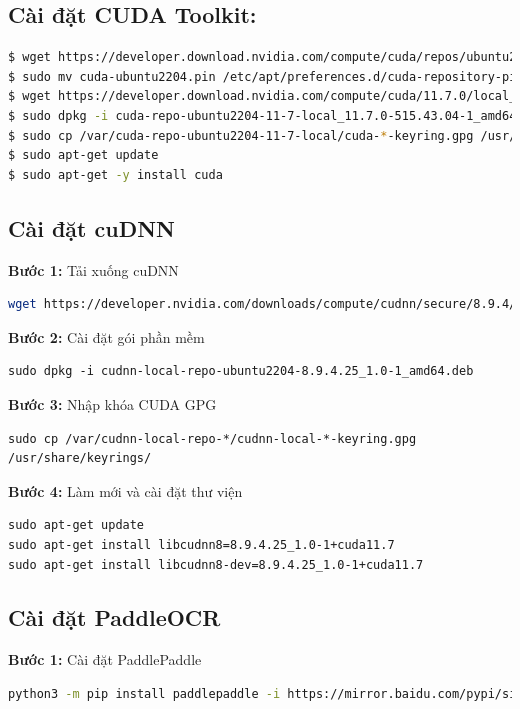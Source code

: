 \subsection{Cài đặt CUDA Toolkit:}
\begin{lstlisting}[language=bash]
$ wget https://developer.download.nvidia.com/compute/cuda/repos/ubuntu2204/x86_64/cuda-ubuntu2204.pin
$ sudo mv cuda-ubuntu2204.pin /etc/apt/preferences.d/cuda-repository-pin-600
$ wget https://developer.download.nvidia.com/compute/cuda/11.7.0/local_installers/cuda-repo-ubuntu2204-11-7-local_11.7.0-515.43.04-1_amd64.deb
$ sudo dpkg -i cuda-repo-ubuntu2204-11-7-local_11.7.0-515.43.04-1_amd64.deb
$ sudo cp /var/cuda-repo-ubuntu2204-11-7-local/cuda-*-keyring.gpg /usr/share/keyrings/
$ sudo apt-get update
$ sudo apt-get -y install cuda
\end{lstlisting}

\subsection{Cài đặt cuDNN}
\textbf{Bước 1:} Tải xuống cuDNN
\begin{lstlisting}[language=bash]
wget https://developer.nvidia.com/downloads/compute/cudnn/secure/8.9.4/local_installers/11.x/cudnn-local-repo-ubuntu2204-8.9.4.25_1.0-1_amd64.deb
\end{lstlisting}

\textbf{Bước 2:} Cài đặt gói phần mềm
\begin{lstlisting}
sudo dpkg -i cudnn-local-repo-ubuntu2204-8.9.4.25_1.0-1_amd64.deb
\end{lstlisting}

\textbf{Bước 3:} Nhập khóa CUDA GPG
\begin{lstlisting}
sudo cp /var/cudnn-local-repo-*/cudnn-local-*-keyring.gpg /usr/share/keyrings/
\end{lstlisting}

\textbf{Bước 4:} Làm mới và cài đặt thư viện
\begin{lstlisting}
sudo apt-get update
sudo apt-get install libcudnn8=8.9.4.25_1.0-1+cuda11.7
sudo apt-get install libcudnn8-dev=8.9.4.25_1.0-1+cuda11.7
\end{lstlisting}


\subsection{Cài đặt PaddleOCR}
\textbf{Bước 1:} Cài đặt PaddlePaddle
\begin{lstlisting}[language=bash]
    python3 -m pip install paddlepaddle -i https://mirror.baidu.com/pypi/simple
\end{lstlisting}

